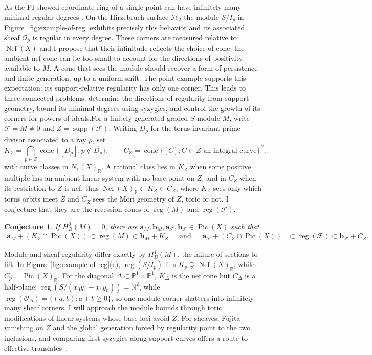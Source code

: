 \documentclass[11pt,reqno]{amsart}
\newtheorem{conjecture}[lemma]{Conjecture}
\theoremstyle{remark}
\newcommand{\reg}{\operatorname{reg}}
\newcommand{\Pic}{\operatorname{Pic}}
\newcommand{\supp}{\operatorname{supp}}
\newcommand{\Nef}{\operatorname{Nef}}
\newcommand{\cone}{\operatorname{cone}}
\renewcommand{\aa}{\mathbf{a}}
\newcommand{\bb}{\mathbf{b}}
\newcommand{\NN}{\mathbb{N}}
\newcommand{\PP}{\mathbb{P}}
\newcommand{\RR}{\mathbb{R}}
\newcommand{\cF}{\mathcal{F}}
\newcommand{\cH}{\mathcal{H}}
\newcommand{\cO}{\mathcal{O}}
\begin{document}
As the PI showed coordinate ring of a single point can have infinitely many minimal regular degrees \cite{bruceHellerSayrafi22}. On the Hirzebruch surface $\cH_2$ the module $S/I_p$ in Figure~\ref{fig:example-of-reg} exhibits precisely this behavior and its associated sheaf $\cO_p$ is regular in every degree. These corners are measured relative to $\Nef(X)$ and I propose that their infinitude reflects the choice of cone: the ambient nef cone can be too small to account for the directions of positivity available to $M$. A cone that sees the module should recover a form of persistence and finite generation, up to a uniform shift. The point example supports this expectation: its support-relative regularity has only one corner. This leads to three connected problems: determine the directions of regularity from support geometry, bound its minimal degrees using syzygies, and control the growth of its corners for powers of ideals.For a finitely generated graded $S$-module $M$, write $\cF= \widetilde{M}\neq0$ and $Z=\supp(\cF)$. Writing $D_\rho$ for the torus-invariant prime divisor associated to a ray $\rho$, set
\[
K_Z=\bigcap_{p\in Z}\cone\{[D_\rho]:p\notin D_\rho\},
\qquad
C_Z=\overline{\cone\{[C]:C\subset Z\text{ an integral curve}\}}^{\,\vee},
\]
with curve classes in $N_1(X)_{\RR}$. A rational class lies in $K_Z$ when some positive multiple has an ambient linear system with no base point on $Z$, and in $C_Z$ when its restriction to $Z$ is nef; thus $\Nef(X)_{\RR}\subset K_Z\subset C_Z$, where $K_Z$ sees only which torus orbits meet $Z$ and $C_Z$ sees the Mori geometry of $Z$, toric or not. I conjecture that they are the recession cones of $\reg(M)$ and $\reg(\cF)$.

\begin{conjecture}\label{conj:support-cone-duality}
If $H_B^0(M)=0$, there are $\aa_M,\bb_M,\aa_{\cF},\bb_{\cF}\in\Pic(X)$ such that
\[
\begin{aligned}
\aa_M+(K_Z\cap\Pic(X))\subset\reg(M)\subset\bb_M+K_Z \quad \;\; \text{and} \quad \;\; 
\aa_{\cF}+(C_Z\cap\Pic(X))&\subset\reg(\cF)\subset\bb_{\cF}+C_Z.
\end{aligned}
\]
\end{conjecture}

Module and sheaf regularity differ exactly by $H_B^1(M)$, the failure of sections to lift. In Figure~\ref{fig:example-of-reg}(c), $\reg(S/I_p)$ fills $K_p\supsetneq\Nef(X)_{\RR}$, while $C_p=\Pic(X)_{\RR}$. For the diagonal $\Delta\subset\PP^1\times\PP^1$, $K_\Delta$ is the nef cone but $C_\Delta$ is a half-plane: $\reg(S/(x_0y_1-x_1y_0))=\NN^2$, while $\reg(\cO_\Delta)=\{(a,b):a+b\ge0\}$, so one module corner shatters into infinitely many sheaf corners. I will approach the module bounds through toric modifications of linear systems whose base loci avoid $Z$. For sheaves, Fujita vanishing on $Z$ and the global generation forced by regularity point to the two inclusions, and comparing first syzygies along support curves offers a route to effective translates~\cite{keeler03,maclaganSmith04}.
\end{document}
